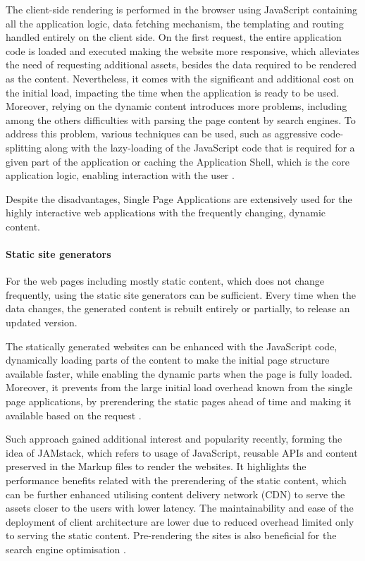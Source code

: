 The client-side rendering is performed in the browser using JavaScript containing all the application logic, data fetching mechanism, the templating and routing handled entirely on the client side. On the first request, the entire application code is loaded and executed making the website more responsive, which alleviates the need of requesting additional assets, besides the data required to be rendered as the content. Nevertheless, it comes with the significant and additional cost on the initial load, impacting the time when the application is ready to be used. Moreover, relying on the dynamic content introduces more problems, including among the others difficulties with parsing the page content by search engines. To address this problem, various techniques can be used, such as aggressive code-splitting along with the lazy-loading of the JavaScript code that is required for a given part of the application or caching the Application Shell, which is the core application logic, enabling interaction with the user \cite{GoogleRenderingOnTheWeb}.

Despite the disadvantages, Single Page Applications are extensively used for the highly interactive web applications with the frequently changing, dynamic content.

\paragraph{Static site generators}

For the web pages including mostly static content, which does not change frequently, using the static site generators can be sufficient. Every time when the data changes, the generated content is rebuilt entirely or partially, to release an updated version.

The statically generated websites can be enhanced with the JavaScript code, dynamically loading parts of the content to make the initial page structure available faster, while enabling the dynamic parts when the page is fully loaded. Moreover, it prevents from the large initial load overhead known from the single page applications, by prerendering the static pages ahead of time and making it available based on the request \cite{GoogleRenderingOnTheWeb}.

Such approach gained additional interest and popularity recently, forming the idea of JAMstack, which refers to usage of JavaScript, reusable APIs and content preserved in the Markup files to render the websites. It highlights the performance benefits related with the prerendering of the static content, which can be further enhanced utilising content delivery network (CDN) to serve the assets closer to the users with lower latency. The maintainability and ease of the deployment of client architecture are lower due to reduced overhead limited only to serving the static content. Pre-rendering the sites is also beneficial for the search engine optimisation \cite{JAMstack}.

